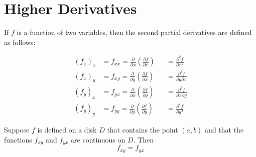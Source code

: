 
\section{Higher Derivatives}

If $f$ is a function of two variables, then the second partial derivatives are defined as follows:

\begin{equation}
  \nonumber
  \begin{aligned}
    (f_x)_x &= f_{xx} = \frac{\partial}{\partial x} \left( \frac{\partial f}{\partial x} \right) &&= \frac{\partial^2 f}{\partial x^2} \\
    (f_x)_y &= f_{xy} = \frac{\partial}{\partial y} \left( \frac{\partial f}{\partial x} \right) &&= \frac{\partial^2 f}{\partial y \partial x} \\
    (f_y)_x &= f_{yx} = \frac{\partial}{\partial x} \left( \frac{\partial f}{\partial y} \right) &&= \frac{\partial^2 f}{\partial x \partial y} \\
    (f_y)_y &= f_{yy} = \frac{\partial}{\partial y} \left( \frac{\partial f}{\partial y} \right) &&= \frac{\partial^2 f}{\partial y^2}
  \end{aligned}
\end{equation}

\begin{theorem}
  Suppose \(f\) is defined on a disk \(D\) that contains the point \((a, b)\) and that the functions \(f_{xy}\) and \(f_{yx}\) are continuous on \(D\). Then
  \[
    f_{xy} = f_{yx}
  \]
\end{theorem}

